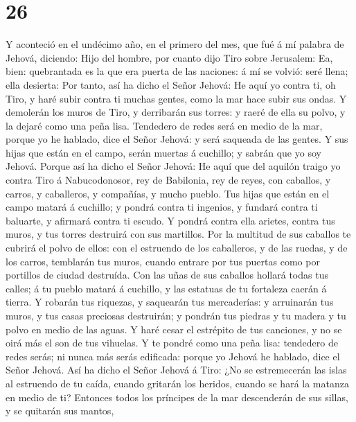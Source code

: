 \hypertarget{section-25}{%
\section{26}\label{section-25}}

 Y aconteció en el undécimo año, en el primero del mes, que
fué á mí palabra de Jehová, diciendo:  Hijo del hombre, por
cuanto dijo Tiro sobre Jerusalem: Ea, bien: quebrantada es la que era
puerta de las naciones: á mí se volvió: seré llena; ella desierta:
 Por tanto, así ha dicho el Señor Jehová: He aquí yo contra
ti, oh Tiro, y haré subir contra ti muchas gentes, como la mar hace
subir sus ondas.  Y demolerán los muros de Tiro, y
derribarán sus torres: y raeré de ella su polvo, y la dejaré como una
peña lisa.  Tendedero de redes será en medio de la mar,
porque yo he hablado, dice el Señor Jehová: y será saqueada de las
gentes.  Y sus hijas que están en el campo, serán muertas á
cuchillo; y sabrán que yo soy Jehová.  Porque así ha dicho
el Señor Jehová: He aquí que del aquilón traigo yo contra Tiro á
Nabucodonosor, rey de Babilonia, rey de reyes, con caballos, y carros, y
caballeros, y compañías, y mucho pueblo.  Tus hijas que
están en el campo matará á cuchillo; y pondrá contra ti ingenios, y
fundará contra ti baluarte, y afirmará contra ti escudo.  Y
pondrá contra ella arietes, contra tus muros, y tus torres destruirá con
sus martillos.  Por la multitud de sus caballos te cubrirá
el polvo de ellos: con el estruendo de los caballeros, y de las ruedas,
y de los carros, temblarán tus muros, cuando entrare por tus puertas
como por portillos de ciudad destruída.  Con las uñas de
sus caballos hollará todas tus calles; á tu pueblo matará á cuchillo, y
las estatuas de tu fortaleza caerán á tierra.  Y robarán
tus riquezas, y saquearán tus mercaderías: y arruinarán tus muros, y tus
casas preciosas destruirán; y pondrán tus piedras y tu madera y tu polvo
en medio de las aguas.  Y haré cesar el estrépito de tus
canciones, y no se oirá más el son de tus vihuelas.  Y te
pondré como una peña lisa: tendedero de redes serás; ni nunca más serás
edificada: porque yo Jehová he hablado, dice el Señor Jehová.
 Así ha dicho el Señor Jehová á Tiro: ¿No se estremecerán
las islas al estruendo de tu caída, cuando gritarán los heridos, cuando
se hará la matanza en medio de ti?  Entonces todos los
príncipes de la mar descenderán de sus sillas, y se quitarán sus mantos,
